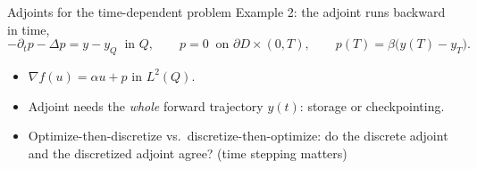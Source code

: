 \documentclass[main.tex]{subfiles}
\begin{document}
\begin{frame}{Adjoints for the time-dependent problem}
  Example 2: the adjoint runs backward in time,
  \[
    -\partial_t p - \Delta p = y - y_Q \;\;\text{in } Q, \qquad p = 0 \;\;\text{on } \partial D\times(0,T), \qquad p(T) = \beta\big(y(T) - y_T\big).
  \]
  \begin{itemize}
    \item $\nabla f(u) = \alpha u + p$ in $L^2(Q)$.
    \item Adjoint needs the \emph{whole} forward trajectory $y(t)$: storage or checkpointing.
    \item Optimize-then-discretize vs.\ discretize-then-optimize: do the discrete adjoint and the discretized adjoint agree? (time stepping matters)
  \end{itemize}
\end{frame}
\end{document}

